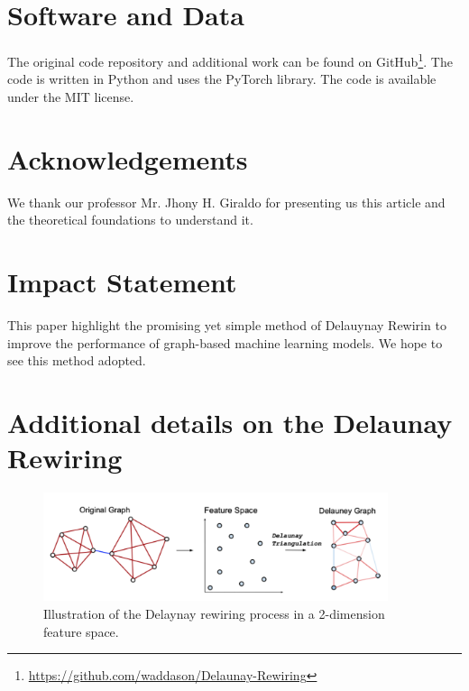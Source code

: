 \documentclass{article}
\theoremstyle{plain}
\theoremstyle{definition}
\theoremstyle{remark}
\begin{document}

\section*{Software and Data}

The original code repository and additional work can be found on GitHub\footnote{ 
\url{https://github.com/waddason/Delaunay-Rewiring}}.
The code is written in Python and uses the PyTorch library. The code is available under the MIT license.

\section*{Acknowledgements}

We thank our professor Mr. Jhony H. Giraldo for presenting us this article and 
the theoretical foundations to understand it.

\section*{Impact Statement}

This paper highlight the promising yet simple method of Delauynay Rewirin to 
improve the performance of graph-based machine learning models.
We hope to see this method adopted.







\newpage
\appendix
\onecolumn

\section{Additional details on the Delaunay Rewiring }
\label{app:delaunay}
\begin{figure}[h!]
    \label{fig:delaunay_full}
    \includegraphics[width=0.9\textwidth]{figures/delaunay_process.png}
    \caption{Illustration of the Delaynay rewiring process in a 2-dimension feature space.}
\end{figure}
\end{document}
